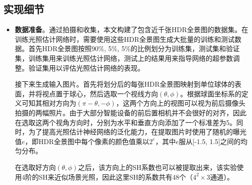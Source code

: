 \subsection{实现细节}
\begin{itemize}
    \item \textbf{数据准备}。通过拍摄和收集，本文构建了包含近千张HDR全景图的数据集。在训练光照估计网络时，需要使用这些HDR全景图生成大批量的训练和测试数据。首先HDR全景图按照90\%, 5\%, 5\%的比例划分为训练集，测试集和验证集，训练集用来训练光照估计网络，测试上的结果用来指导网络的超参数调整。验证集用以评估光照估计网络的表现。
    
    接下来生成输入图片。首先将划分后的每张HDR全景图映射到单位球体的表面，并将视点置于球心，然后选取一个视线方向$(\theta, \phi)$。根据球面坐标系的定义可知其相对方向为$(\pi-\theta, -\phi)$，这两个方向上的视图可以视为前后摄像头拍摄的两幅照片。由于大部分智能设备的前后置相机并不会很好的对齐，因此在选取这两个视角方向时，分别为水平和垂直方向添加了一个标准差为5。同时，为了提高光照估计神经网络的泛化能力，在提取图片时使用了随机的曝光值$e$，即HDR全景图中每个像素的颜色值乘以$2^e$，其中$e$服从[-1.5, 1.5]之间的均匀分布。

    在选取好方向$(\theta, \phi)$之后，该方向上的SH系数也可以被提取出来，该实验使用4阶的SH来近似场景光照，因此这里SH的系数共有48个（$4^2\times3$通道）。
    

\end{itemize}
